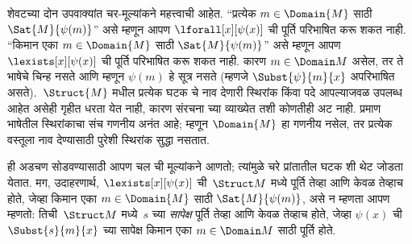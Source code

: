 \begin{explain}
शेवटच्या दोन उपवाक्यांत
चर-मूल्यांकने महत्त्वाची आहेत. ``प्रत्येक $m \in
\Domain{M}$ साठी $\Sat{M}{\psi(m)}$'' असे म्हणून आपण
$\lforall[x][\psi(x)]$ ची पूर्ति परिभाषित करू शकत नाही.
 ``किमान एका $m \in \Domain{M}$ साठी $\Sat{M}{\psi(m)}$''
असे म्हणून आपण $\lexists[x][\psi(x)]$ ची पूर्ति परिभाषित करू शकत नाही.
कारण $m \in \Domain M$ असेल, तर ते भाषेचे चिन्ह नसते आणि म्हणून
$\psi(m)$ हे सूत्र नसते (म्हणजे $\Subst{\psi}{m}{x}$ अपरिभाषित
असते).~$\Struct{M}$ मधील प्रत्येक घटक चे नाव देणारी
स्थिरांक किंवा पदे
आपल्याजवळ उपलब्ध आहेत असेही गृहीत धरता येत नाही, कारण संरचना
च्या व्याख्येत तशी कोणतीही अट नाही. प्रमाण भाषेतील स्थिरांकाचा
संच गणनीय अनंत आहे; म्हणून $\Domain{M}$ हा गणनीय नसेल,
तर प्रत्येक वस्तूला नाव देण्यासाठी पुरेशी स्थिरांक सुद्धा नसतात.

ही अडचण सोडवण्यासाठी आपण चल ची मूल्यांकने आणतो; त्यांमुळे
चरे प्रांतातील घटक शी थेट जोडता येतात. मग, उदाहरणार्थ,
$\lexists[x][\psi(x)]$ ची~$\Struct M$
मध्ये पूर्ति तेव्हा आणि केवळ तेव्हाच होते, जेव्हा
किमान एका $m \in \Domain{M}$ साठी $\Sat{M}{\psi(m)}$, असे न म्हणता आपण म्हणतो:
तिची~$\Struct M$ मध्ये~$s$ च्या \emph{सापेक्ष} पूर्ति तेव्हा आणि केवळ
तेव्हाच होते, जेव्हा $\psi(x)$ ची~$\Subst{s}{m}{x}$ च्या सापेक्ष
किमान एका $m \in \Domain M$ साठी पूर्ति होते.

\end{explain}

